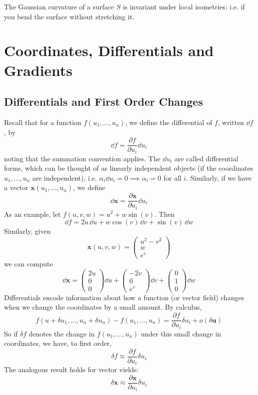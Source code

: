 \documentclass{article}
\begin{document}
\begin{theorem}
    The Gaussian curvature of a surface $S$ is invariant under local isometries; i.e. if you bend the surface without stretching it.
\end{theorem}

\section{Coordinates, Differentials and Gradients}
\subsection{Differentials and First Order Changes}
Recall that for a function $f(u_1, \dots, u_n)$, we define the differential of $f$, written $\dd f$, by
\[ \dd f = \frac{\partial f}{\partial u_i} \dd u_i \]
noting that the summation convention applies. The $\dd u_i$ are called differential forms, which can be thought of as linearly independent objects (if the coordinates $u_1, \dots, u_n$ are independent), i.e. $\alpha_i \dd u_i = 0 \implies \alpha_i = 0$ for all $i$. Similarly, if we have a vector $\bm x(u_1, \dots, u_n)$, we define
\[ \dd \bm x = \frac{\partial \bm x}{\partial u_i} \dd u_i \]
As an example, let $f(u, v, w) = u^2 + w \sin(v)$. Then
\[ \dd f = 2u \,\dd u + w \cos(v) \,\dd v + \sin(v) \,\dd w \]
Similarly, given
\[ \bm x(u, v, w) = \begin{pmatrix}
        u^2 - v^2 \\ w \\ e^v
    \end{pmatrix} \]
we can compute
\[ \dd \bm x = \begin{pmatrix}
        2u \\ 0 \\ 0
    \end{pmatrix} \dd u + \begin{pmatrix}
        -2v \\ 0 \\ e^v
    \end{pmatrix} \dd v + \begin{pmatrix}
        0 \\ 1 \\ 0
    \end{pmatrix} \dd w \]
Differentials encode information about how a function (or vector field) changes when we change the coordinates by a small amount. By calculus,
\[ f(u + \delta u_1, \dots, u_n + \delta u_n) - f(u_1, \dots, u_n) = \frac{\partial f}{\partial u_i} \delta u_i + o(\delta \bm u) \]
So if $\delta f$ denotes the change in $f(u_1, \dots, u_n)$ under this small change in coordinates, we have, to first order,
\[ \delta f \approx \frac{\partial f}{\partial u_i}\delta u_i \]
The analogous result holds for vector vields:
\[ \delta \bm x \approx \frac{\partial \bm x}{\partial u_i}\delta u_i \]
\end{document}
